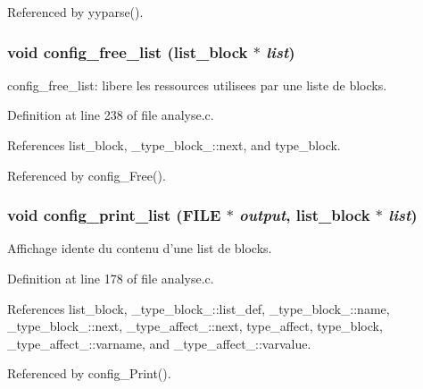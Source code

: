 Referenced by yyparse().
\subsubsection{\setlength{\rightskip}{0pt plus 5cm}void config\_\-free\_\-list ({\bf list\_\-block} $\ast$ {\em list})}\label{analyse_8h_a12}


config\_\-free\_\-list: libere les ressources utilisees par une liste de blocks. 

Definition at line 238 of file analyse.c.

References list\_\-block, \_\-type\_\-block\_\-::next, and type\_\-block.

Referenced by config\_\-Free().
\subsubsection{\setlength{\rightskip}{0pt plus 5cm}void config\_\-print\_\-list (FILE $\ast$ {\em output}, {\bf list\_\-block} $\ast$ {\em list})}\label{analyse_8h_a11}


Affichage idente du contenu d'une list de blocks. 

Definition at line 178 of file analyse.c.

References list\_\-block, \_\-type\_\-block\_\-::list\_\-def, \_\-type\_\-block\_\-::name, \_\-type\_\-block\_\-::next, \_\-type\_\-affect\_\-::next, type\_\-affect, type\_\-block, \_\-type\_\-affect\_\-::varname, and \_\-type\_\-affect\_\-::varvalue.

Referenced by config\_\-Print().